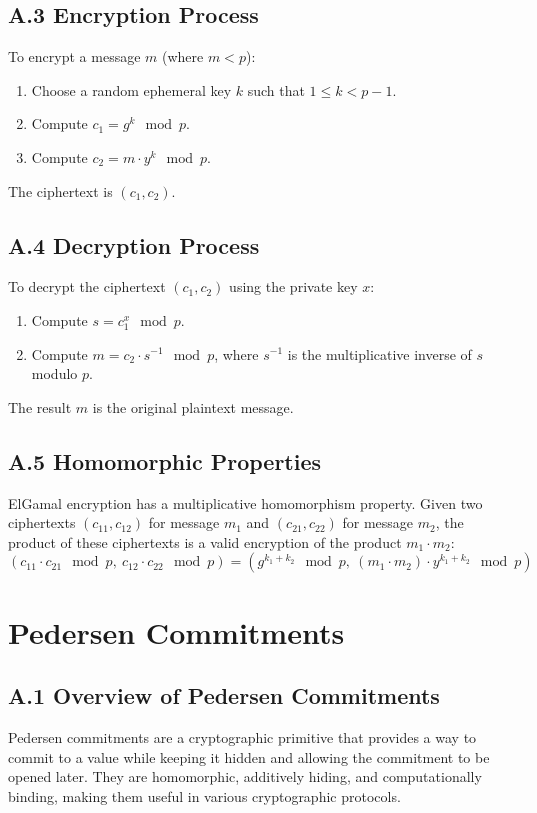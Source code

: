 \documentclass[12pt,a4paper]{report}
\begin{document}
\subsection{A.3 Encryption Process}
To encrypt a message \( m \) (where \( m < p \)):
\begin{enumerate}
    \item Choose a random ephemeral key \( k \) such that \( 1 \leq k < p-1 \).
    \item Compute \( c_1 = g^k \mod p \).
    \item Compute \( c_2 = m \cdot y^k \mod p \).
\end{enumerate}
The ciphertext is \( (c_1, c_2) \).

\subsection{A.4 Decryption Process}
To decrypt the ciphertext \( (c_1, c_2) \) using the private key \( x \):
\begin{enumerate}
    \item Compute \( s = c_1^x \mod p \).
    \item Compute \( m = c_2 \cdot s^{-1} \mod p \), where \( s^{-1} \) is the multiplicative inverse of \( s \) modulo \( p \).
\end{enumerate}
The result \( m \) is the original plaintext message.

\subsection{A.5 Homomorphic Properties}
ElGamal encryption has a multiplicative homomorphism property. Given two ciphertexts \( (c_{11}, c_{12}) \) for message \( m_1 \) and \( (c_{21}, c_{22}) \) for message \( m_2 \), the product of these ciphertexts is a valid encryption of the product \( m_1 \cdot m_2 \):
\[
(c_{11} \cdot c_{21} \mod p, \ c_{12} \cdot c_{22} \mod p) = \left( g^{k_1 + k_2} \mod p, \ (m_1 \cdot m_2) \cdot y^{k_1 + k_2} \mod p \right)
\]

\section{Pedersen Commitments}

\subsection{A.1 Overview of Pedersen Commitments}
Pedersen commitments are a cryptographic primitive that provides a way to commit to a value while keeping it hidden and allowing the commitment to be opened later. They are homomorphic, additively hiding, and computationally binding, making them useful in various cryptographic protocols.
\end{document}
